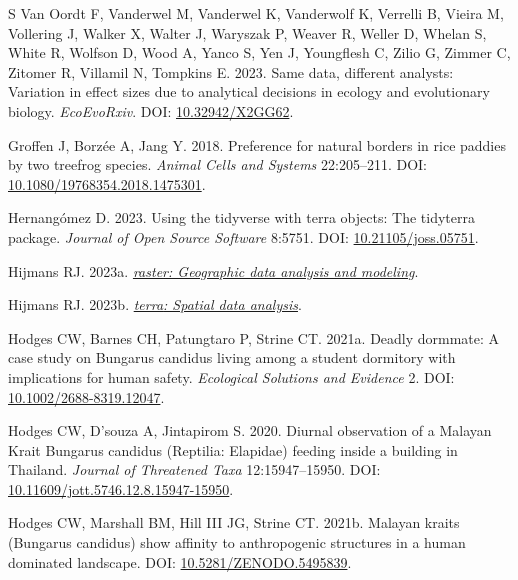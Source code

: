 \documentclass[10pt,a4paper]{article}
\newlength{\cslhangindent}
\newenvironment{CSLReferences}[2] %
 {\begin{list}{}{%
  \setlength{\itemindent}{0pt}
  \setlength{\leftmargin}{0pt}
  \setlength{\parsep}{0pt}
  \ifodd #1
   \setlength{\leftmargin}{\cslhangindent}
   \setlength{\itemindent}{-1\cslhangindent}
  \fi
  \setlength{\itemsep}{#2\baselineskip}}}
 {\end{list}}
\begin{document}
\begin{CSLReferences}{1}{0}
S, Van Oordt F, Vanderwel M, Vanderwel K, Vanderwolf K, Verrelli B, Vieira M, Vollering J, Walker X, Walter J, Waryszak P, Weaver R, Weller D, Whelan S, White R, Wolfson D, Wood A, Yanco S, Yen J, Youngflesh C, Zilio G, Zimmer C, Zitomer R, Villamil N, Tompkins E. 2023. Same data, different analysts: Variation in effect sizes due to analytical decisions in ecology and evolutionary biology. \emph{EcoEvoRxiv}. DOI: \href{https://doi.org/10.32942/X2GG62}{10.32942/X2GG62}.

Groffen J, Borzée A, Jang Y. 2018. Preference for natural borders in rice paddies by two treefrog species. \emph{Animal Cells and Systems} 22:205--211. DOI: \href{https://doi.org/10.1080/19768354.2018.1475301}{10.1080/19768354.2018.1475301}.

Hernangómez D. 2023. Using the {tidyverse} with {terra} objects: The {tidyterra} package. \emph{Journal of Open Source Software} 8:5751. DOI: \href{https://doi.org/10.21105/joss.05751}{10.21105/joss.05751}.

Hijmans RJ. 2023a. \emph{\href{https://CRAN.R-project.org/package=raster}{{raster}: Geographic data analysis and modeling}}.

Hijmans RJ. 2023b. \emph{\href{https://CRAN.R-project.org/package=terra}{{terra}: Spatial data analysis}}.

Hodges CW, Barnes CH, Patungtaro P, Strine CT. 2021a. Deadly dormmate: {A} case study on {Bungarus} {candidus} living among a student dormitory with implications for human safety. \emph{Ecological Solutions and Evidence} 2. DOI: \href{https://doi.org/10.1002/2688-8319.12047}{10.1002/2688-8319.12047}.

Hodges CW, D'souza A, Jintapirom S. 2020. Diurnal observation of a {Malayan} {Krait} {Bungarus} candidus ({Reptilia}: {Elapidae}) feeding inside a building in {Thailand}. \emph{Journal of Threatened Taxa} 12:15947--15950. DOI: \href{https://doi.org/10.11609/jott.5746.12.8.15947-15950}{10.11609/jott.5746.12.8.15947-15950}.

Hodges CW, Marshall BM, Hill III JG, Strine CT. 2021b. Malayan kraits ({Bungarus} candidus) show affinity to anthropogenic structures in a human dominated landscape. DOI: \href{https://doi.org/10.5281/ZENODO.5495839}{10.5281/ZENODO.5495839}.


\end{CSLReferences}
\end{document}
